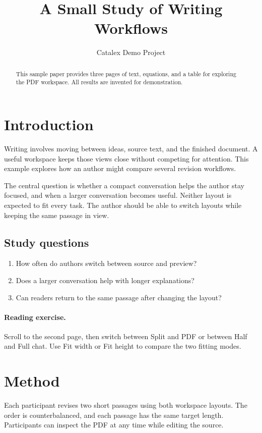 \documentclass[11pt,a4paper]{article}
\title{A Small Study of Writing Workflows}
\author{Catalex Demo Project}
\date{}
\begin{document}
\maketitle
\begin{abstract}
This sample paper provides three pages of text, equations, and a table for
exploring the PDF workspace. All results are invented for demonstration.
\end{abstract}
\section{Introduction}
Writing involves moving between ideas, source text, and the finished document.
A useful workspace keeps those views close without competing for attention.
This example explores how an author might compare several revision workflows.

The central question is whether a compact conversation helps the author stay
focused, and when a larger conversation becomes useful. Neither layout is
expected to fit every task. The author should be able to switch layouts while
keeping the same passage in view.
\subsection{Study questions}
\begin{enumerate}
\item How often do authors switch between source and preview?
\item Does a larger conversation help with longer explanations?
\item Can readers return to the same passage after changing the layout?
\end{enumerate}
\paragraph{Reading exercise.}
Scroll to the second page, then switch between Split and PDF or between Half
and Full chat. Use Fit width or Fit height to compare the two fitting modes.

\newpage
\section{Method}
Each participant revises two short passages using both workspace layouts.
The order is counterbalanced, and each passage has the same target length.
Participants can inspect the PDF at any time while editing the source.
\end{document}
